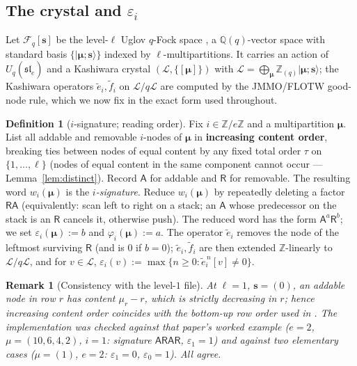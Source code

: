 \documentclass[11pt]{article}
\newtheorem{remark}[theorem]{Remark}
\theoremstyle{definition}
\newtheorem{definition}[theorem]{Definition}
\newcommand{\Fock}{\mathcal{F}}
\newcommand{\Uq}{U_q(\widehat{\mathfrak{sl}}_e)}
\newcommand{\ZZ}{\mathbb{Z}}
\newcommand{\QQ}{\mathbb{Q}}
\newcommand{\Lcr}{\mathcal{L}}
\newcommand{\ee}{\tilde e}
\newcommand{\ff}{\tilde f}
\newcommand{\eps}{\varepsilon}
\newcommand{\Aa}{{\mathsf A}}
\newcommand{\Rr}{{\mathsf R}}
\newcommand{\bs}{\mathbf{s}}
\newcommand{\bmu}{\boldsymbol{\mu}}
\begin{document}
\subsection{The crystal and $\eps_i$}\label{ssec:crystal}

Let $\Fock_q[\bs]$ be the level-$\ell$ Uglov $q$-Fock space
\cite{Uglov2000, Iijima2012}, a $\QQ(q)$-vector space with standard basis
$\{|\bmu;\bs\rangle\}$ indexed by $\ell$-multipartitions. It carries an
action of $\Uq$ and a Kashiwara crystal
$(\Lcr, \{[\bmu]\})$ with $\Lcr = \bigoplus_{\bmu} \ZZ_{(q)}|\bmu;\bs\rangle$;
the Kashiwara operators $\ee_i, \ff_i$ on $\Lcr/q\Lcr$ are computed by
the JMMO/FLOTW good-node rule, which we now fix in the exact form used
throughout.

\begin{definition}[$i$-signature; reading order]\label{def:sig}
Fix $i \in \ZZ/e\ZZ$ and a multipartition $\bmu$. List all addable and
removable $i$-nodes of $\bmu$ in \textbf{increasing content order}, breaking
ties between nodes of equal content by any fixed total order
$\tau$ on $\{1,\dots,\ell\}$ (nodes of equal content in the same
component cannot occur --- Lemma~\ref{lem:distinct}). Record $\Aa$ for
addable and $\Rr$ for removable. The resulting word $w_i(\bmu)$ is the
\emph{$i$-signature}. Reduce $w_i(\bmu)$ by repeatedly deleting a factor
$\Rr\Aa$ (equivalently: scan left to right on a stack; an $\Aa$ whose
predecessor on the stack is an $\Rr$ cancels it, otherwise push).
The reduced word has the form $\Aa^a\Rr^b$; we set
$\eps_i(\bmu) := b$ and $\varphi_i(\bmu) := a$.
The operator $\ee_i$ removes the node of the leftmost surviving $\Rr$
(and is $0$ if $b=0$); $\ee_i, \ff_i$ are then extended $\ZZ$-linearly to
$\Lcr/q\Lcr$, and for $v \in \Lcr$,
$\eps_i(v) := \max\{n \ge 0 : \ee_i^{\,n}[v] \ne 0\}$.
\end{definition}

\begin{remark}[Consistency with the level-$1$ file]\label{rmk:lvl1conv}
At $\ell = 1$, $\bs = (0)$, an addable node in row $r$ has content
$\mu_r - r$, which is \emph{strictly decreasing} in $r$; hence increasing
content order coincides with the bottom-up row order used in
\cite{Clio-C5-2026-08-11}. The implementation was checked against that
paper's worked example ($e=2$, $\mu = (10,6,4,2)$, $i=1$: signature
$\Aa\Rr\Aa\Rr$, $\eps_1 = 1$) and against two elementary cases
($\mu = (1)$, $e=2$: $\eps_1 = 0$, $\eps_0 = 1$). All agree.
\end{remark}
\end{document}
